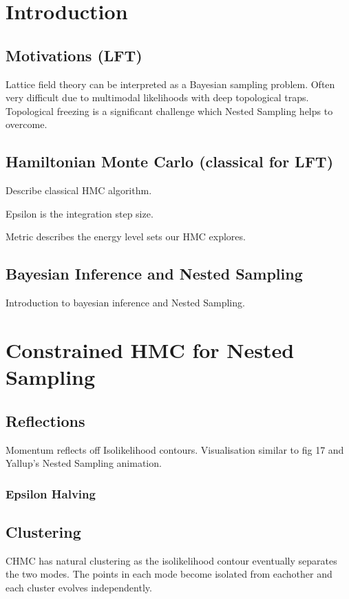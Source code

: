 \documentclass[11pt]{article}
\begin{document}
    \section{Introduction}
    \subsection{Motivations (LFT)}
    Lattice field theory can be interpreted as a Bayesian sampling problem.
    Often very difficult due to multimodal likelihoods with deep topological traps.
    Topological freezing is a significant challenge which Nested Sampling helps to overcome.

    \subsection{Hamiltonian Monte Carlo (classical for LFT)}
    Describe classical HMC algorithm. \autocite{betancourt2018conceptual}

    Epsilon is the integration step size.

    Metric describes the energy level sets our HMC explores.

    \subsection{Bayesian Inference and Nested Sampling}
    Introduction to bayesian inference and Nested Sampling.\cite{Handley_polychord}

    \newpage
    \section{Constrained HMC for Nested Sampling}
    \subsection{Reflections}
    Momentum reflects off Isolikelihood contours. Visualisation similar to \cite{betancourt2016integrationtime} fig 17
    and Yallup's Nested Sampling animation.

    \subsubsection{Epsilon Halving}

    \subsection{Clustering}
    CHMC has natural clustering as the isolikelihood contour eventually separates the two modes.
    The points in each mode become isolated from eachother and each cluster evolves independently.
\end{document}
